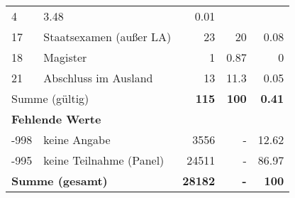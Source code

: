 \begin{longtable}{lXrrr}
       \num{4} &
       \num[round-mode=places,round-precision=2]{3.48} &
         \num[round-mode=places,round-precision=2]{0.01} \\

     17 &
     \multicolumn{1}{X}{ Staatsexamen (außer LA)   } &


       \num{23} &
       \num[round-mode=places,round-precision=2]{20} &
         \num[round-mode=places,round-precision=2]{0.08} \\

     18 &
     \multicolumn{1}{X}{ Magister   } &


       \num{1} &
       \num[round-mode=places,round-precision=2]{0.87} &
         \num[round-mode=places,round-precision=2]{0} \\

     21 &
     \multicolumn{1}{X}{ Abschluss im Ausland   } &


       \num{13} &
       \num[round-mode=places,round-precision=2]{11.3} &
         \num[round-mode=places,round-precision=2]{0.05} \\
     \midrule
     \multicolumn{2}{l}{Summe (gültig)} &
       \textbf{\num{115}} &
     \textbf{100} &
       \textbf{\num[round-mode=places,round-precision=2]{0.41}} \\
     \multicolumn{5}{l}{\textbf{Fehlende Werte}}\\
       -998 &
       keine Angabe &
         \num{3556} &
        - &
         \num[round-mode=places,round-precision=2]{12.62} \\
       -995 &
       keine Teilnahme (Panel) &
         \num{24511} &
        - &
         \num[round-mode=places,round-precision=2]{86.97} \\
     \midrule
     \multicolumn{2}{l}{\textbf{Summe (gesamt)}} &
          \textbf{\num{28182}} &
        \textbf{-} &
        \textbf{100} \\
     \bottomrule
     \end{longtable}
     

